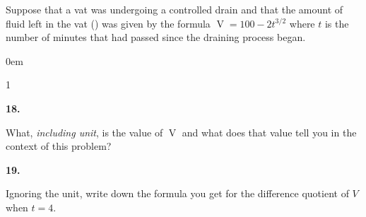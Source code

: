 \documentclass[12pt,]{book}
\theoremstyle{plain}
\theoremstyle{definition}
\numberwithin{equation}{section}
\newcommand{\hrulemedium}{\noalign{\hrule height 0.07em}}
\newcommand{\hrulethick} {\noalign{\hrule height 0.11em}}
\newcounter{figstack}
\newcounter{figindex}
\newlength\fight
\newcommand\pushValignCaptionBottom[5][b]{%
\stepcounter{figstack}%
\expandafter\def\csname %
figalign\romannumeral\value{figstack}\endcsname{#1}%
\expandafter\def\csname %
figtype\romannumeral\value{figstack}\endcsname{#2}%
\expandafter\def\csname %
figwd\romannumeral\value{figstack}\endcsname{#3}%
\expandafter\def\csname %
figcontent\romannumeral\value{figstack}\endcsname{#4}%
\expandafter\def\csname %
figcap\romannumeral\value{figstack}\endcsname{#5}%
\setbox0=\hbox{%
\begin{#2}{#3}#4\end{#2}}%
\ifdim\dimexpr\ht0+\dp0\relax>\fight\global\setlength{\fight}{%
\dimexpr\ht0+\dp0\relax}\fi%
}
\newcommand\popValignCaptionBottom{%
\setcounter{figindex}{0}%
\hfill%
\whiledo{\value{figindex}<\value{figstack}}{%
\stepcounter{figindex}%
\def\tmp{\csname figwd\romannumeral\value{figindex}\endcsname}%
\begin{\csname figtype\romannumeral\value{figindex}\endcsname}[t]{\tmp}%
\centering%
\stackinset{c}{}%
{\csname figalign\romannumeral\value{figindex}\endcsname}{}%
{\csname figcontent\romannumeral\value{figindex}\endcsname}%
{\rule{0pt}{\fight}}\par%
\csname figcap\romannumeral\value{figindex}\endcsname%
\end{\csname figtype\romannumeral\value{figindex}\endcsname}%
\hfill%
}%
\setcounter{figstack}{0}%
\setlength{\fight}{0pt}%
\hfill%
}
\newenvironment{exercisegroup}%
{\medskip\noindent}%
{\par\bigskip}%
\newlength{\exercisegroupindent}%
\newlength{\exercisegroupitemwidth}%
\newenvironment{exercisegrouplist}%
{\vspace{-\partopsep}%
\begin{adjustwidth}{\exercisegroupindent}{0em}}%
{\end{adjustwidth}%
\vspace{-\partopsep}%
\vspace{\baselineskip}}%
\newenvironment{exercisegroupbycol}[1]%
{\begin{exercisegrouplist}%
\vspace{-\multicolsep}%
\begin{multicols}{#1}%
\setlength{\parindent}{0em}%
\setlength{\exercisegroupitemwidth}{\linewidth}}%
{\end{multicols}%
\vspace{-\multicolsep}%
\end{exercisegrouplist}}%
\newenvironment{exercisegroupitem}[1]%
{\begin{minipage}[t]{\exercisegroupitemwidth}
\vspace{0pt}%
{\bfseries#1}%
\rule{0pt}{\baselineskip}}{\strut%
\end{minipage}%
\hspace{\columnsep}}%
\providecommand\phantomsection{}
\newcommand{\fe}[2]{\mathop{{#1}{\left(#2\right)}}}
\begin{document}
\begin{exercisegroup}%
Suppose that a vat was undergoing a controlled drain and that the amount of fluid left in the vat (\si{\gallon}) was given by the formula \(\fe{V}{t}=100-2t^{3/2}\) where \(t\) is the number of minutes that had passed since the draining process began.%
\par
\begin{exercisegroupbycol}{1}%
\begin{exercisegroupitem}{18. }\phantomsection\hypertarget{exercise-vat-first}{\null}
What, \emph{including unit}, is the value of \(\fe{V}{4}\) and what does that value tell you in the context of this problem?%
\end{exercisegroupitem}%
\par%
\begin{exercisegroupitem}{19. }\phantomsection\hypertarget{exercise-27}{\null}
Ignoring the unit, write down the formula you get for the difference quotient of \(V\) when \(t=4\).%
\end{exercisegroupitem}%
\par%

\end{exercisegroupbycol}
\end{exercisegroup}
\end{document}
